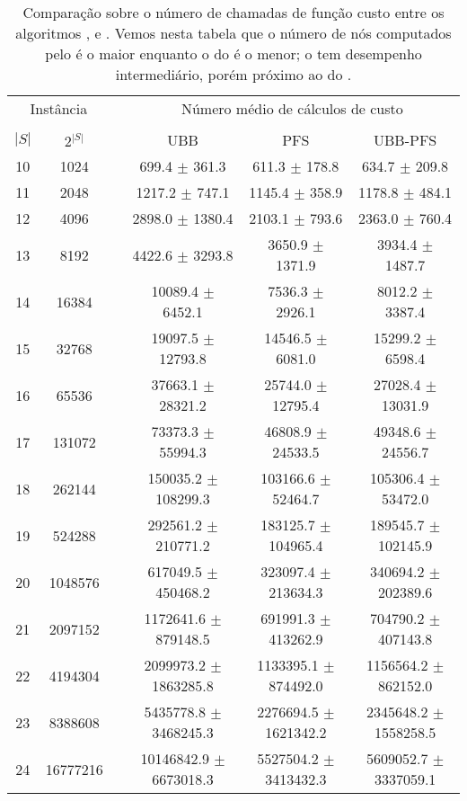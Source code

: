 \begin{table}
\centering
\footnotesize
\begin{tabular}{cc c ccc}
\toprule
\multicolumn{2}{c}{Instância} & \phantom{} & \multicolumn{3}{c}{Número médio de cálculos de custo}\\
\cline{1-2}\cline{4-6} \\
$|S|$ & $2^{|S|}$ && UBB & PFS & UBB-PFS  \\
10 &    1024  && 699.4 $\pm$ 361.3 & 611.3 $\pm$ 178.8 & 634.7 $\pm$ 209.8 \\
11 &    2048  && 1217.2 $\pm$ 747.1 & 1145.4 $\pm$ 358.9 & 1178.8 $\pm$ 484.1 \\
12 &    4096  && 2898.0 $\pm$ 1380.4 & 2103.1 $\pm$ 793.6 & 2363.0 $\pm$ 760.4 \\
13 &    8192  && 4422.6 $\pm$ 3293.8 & 3650.9 $\pm$ 1371.9 & 3934.4 $\pm$ 1487.7 \\
14 &   16384  && 10089.4 $\pm$ 6452.1 & 7536.3 $\pm$ 2926.1 & 8012.2 $\pm$ 3387.4 \\
15 &   32768  && 19097.5 $\pm$ 12793.8 & 14546.5 $\pm$ 6081.0 & 15299.2 $\pm$ 6598.4 \\
16 &   65536  && 37663.1 $\pm$ 28321.2 & 25744.0 $\pm$ 12795.4 & 27028.4 $\pm$ 13031.9 \\
17 &  131072  && 73373.3 $\pm$ 55994.3 & 46808.9 $\pm$ 24533.5 & 49348.6 $\pm$ 24556.7 \\
18 &  262144  && 150035.2 $\pm$ 108299.3 & 103166.6 $\pm$ 52464.7 & 105306.4 $\pm$ 53472.0 \\
19 &  524288  && 292561.2 $\pm$ 210771.2 & 183125.7 $\pm$ 104965.4 & 189545.7 $\pm$ 102145.9 \\
20 & 1048576  && 617049.5 $\pm$ 450468.2 & 323097.4 $\pm$ 213634.3 & 340694.2 $\pm$ 202389.6 \\
21 & 2097152  && 1172641.6 $\pm$ 879148.5 & 691991.3 $\pm$ 413262.9 & 704790.2 $\pm$ 407143.8 \\
22 & 4194304  && 2099973.2 $\pm$ 1863285.8 & 1133395.1 $\pm$ 874492.0 & 1156564.2 $\pm$ 862152.0 \\
23 & 8388608  && 5435778.8 $\pm$ 3468245.3 & 2276694.5 $\pm$ 1621342.2 & 2345648.2 $\pm$ 1558258.5 \\
24 & 16777216 && 10146842.9 $\pm$ 6673018.3 & 5527504.2 $\pm$ 3413432.3 & 5609052.7 $\pm$ 3337059.1 \\
\bottomrule
\end{tabular}
\caption{Comparação sobre o número de chamadas de função custo entre
os algoritmos ,  e . Vemos
nesta tabela que o número de nós computados pelo  é o maior
enquanto o do  é o menor; o  tem 
desempenho intermediário, porém próximo ao do .}
\label{tab:ubbpfs_vs_ubb_vs_pfs_computed_nodes}
\end{table}
